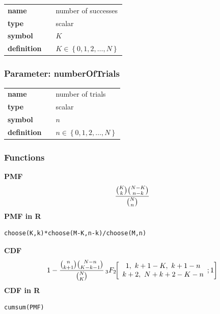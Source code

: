 \noindent\begin{tabular}{p{2cm}cl}
\textbf{name} & & number of successes \\
\textbf{type} & & scalar \\
\textbf{symbol} & & $K$  \\
\textbf{definition} & & $K \in \left\{0,1,2,\dots,N\right\} $
\end{tabular}
\subsubsection*{Parameter: numberOfTrials}

\noindent\begin{tabular}{p{2cm}cl}
\textbf{name} & & number of trials \\
\textbf{type} & & scalar \\
\textbf{symbol} & & $n$  \\
\textbf{definition} & & $n \in \left\{0,1,2,\dots,N\right\}$
\end{tabular}
\subsubsection*{Functions}

\smallskip \noindent \hspace{.2cm} \textbf{PMF} 
\begin{equation*}{{{K \choose k} {{N-K} \choose {n-k}}}\over {N \choose n}}\end{equation*}
\smallskip \noindent \hspace{.2cm} \textbf{PMF in R}  
\begin{verbatim}choose(K,k)*choose(M-K,n-k)/choose(M,n)\end{verbatim}
\smallskip \noindent \hspace{.2cm} \textbf{CDF} 
\begin{equation*}1-{{{n \choose {k+1}}{{N-n} \choose {K-k-1}}}\over {N \choose K}} \,_3F_2\!\!\left[\begin{array}{c}1,\ k+1-K,\ k+1-n \\ k+2,\ N+k+2-K-n\end{array};1\right]\end{equation*}
\smallskip \noindent \hspace{.2cm} \textbf{CDF in R} 
\begin{verbatim}cumsum(PMF)\end{verbatim}
\smallskip
